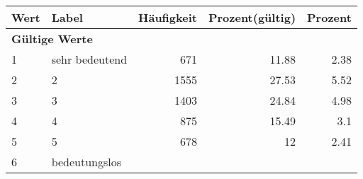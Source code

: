      \begin{longtable}{lXrrr}
     \toprule
     \textbf{Wert} & \textbf{Label} & \textbf{Häufigkeit} & \textbf{Prozent(gültig)} & \textbf{Prozent} \\
     \endhead
     \midrule
     \multicolumn{5}{l}{\textbf{Gültige Werte}}\\

     1 &
     \multicolumn{1}{X}{ sehr bedeutend   } &


       \num{671} &
       \num[round-mode=places,round-precision=2]{11.88} &
         \num[round-mode=places,round-precision=2]{2.38} \\

     2 &
     \multicolumn{1}{X}{ 2   } &


       \num{1555} &
       \num[round-mode=places,round-precision=2]{27.53} &
         \num[round-mode=places,round-precision=2]{5.52} \\

     3 &
     \multicolumn{1}{X}{ 3   } &


       \num{1403} &
       \num[round-mode=places,round-precision=2]{24.84} &
         \num[round-mode=places,round-precision=2]{4.98} \\

     4 &
     \multicolumn{1}{X}{ 4   } &


       \num{875} &
       \num[round-mode=places,round-precision=2]{15.49} &
         \num[round-mode=places,round-precision=2]{3.1} \\

     5 &
     \multicolumn{1}{X}{ 5   } &


       \num{678} &
       \num[round-mode=places,round-precision=2]{12} &
         \num[round-mode=places,round-precision=2]{2.41} \\

     6 &
     \multicolumn{1}{X}{ bedeutungslos   } &



\end{longtable}
